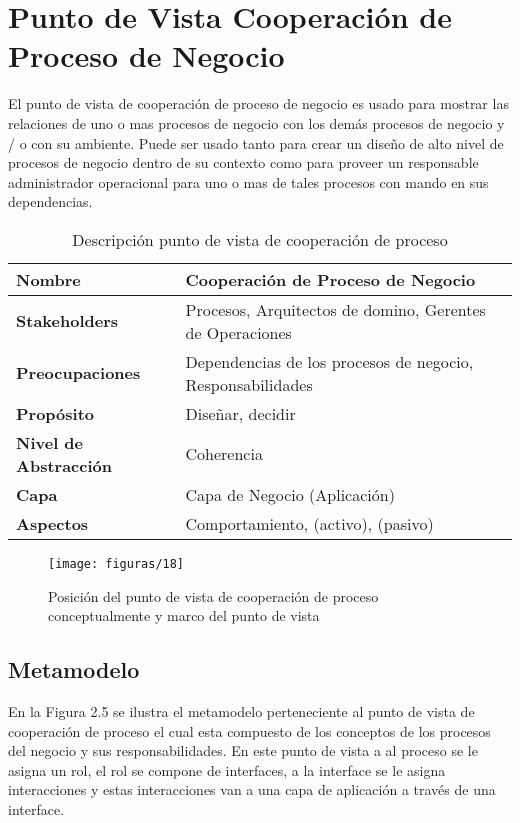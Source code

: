   \section{Punto de Vista Cooperación de Proceso de Negocio}
  El punto de vista de cooperación de proceso de negocio es usado para mostrar las relaciones
  de uno o mas procesos de negocio con los demás procesos de negocio y / o con su ambiente. Puede ser usado tanto para crear un diseño de alto nivel de procesos de negocio dentro de su contexto como para proveer un responsable administrador operacional para uno o mas de tales procesos con mando en sus dependencias.
  
  \begin{table}[H]
  	\centering
  	\begin{tabular}{lp{8cm}}
  		\toprule
  		\textbf{Nombre} & \textbf{Cooperación de Proceso de Negocio} \\
  		\midrule
  		\textbf{Stakeholders} & Procesos, Arquitectos de domino, Gerentes de Operaciones \\
  		\textbf{Preocupaciones} & Dependencias de los procesos de negocio, Responsabilidades \\
  		\textbf{Propósito} & Diseñar, decidir \\
  		\textbf{Nivel de Abstracción} & Coherencia \\
  		\textbf{Capa} & Capa de Negocio (Aplicación) \\
  		\textbf{Aspectos} & Comportamiento, (activo), (pasivo) \\
  		\bottomrule
  	\end{tabular}
  	\captionsetup{width=.95\textwidth}
  	\caption{Descripción punto de vista de cooperación de proceso}
  	\label{tabla8}
  \end{table}
  
  \begin{figure}[H]
  	\centering
  	\texttt{[image: figuras/18]}
  	\captionsetup{width=.95\textwidth}
  	\caption{Posición del punto de vista de cooperación de proceso conceptualmente y marco del punto de vista}
  	\label{figura18}
  \end{figure}
  
  \subsection{Metamodelo}
  En la Figura 2.5 se ilustra el metamodelo perteneciente al punto de vista de cooperación de proceso el cual esta compuesto de los conceptos de los procesos del negocio y sus responsabilidades. En este punto de vista a al proceso se le asigna un rol, el rol se compone de interfaces, a la interface se le asigna interacciones y estas interacciones van a una capa de aplicación a través de una interface.
  
